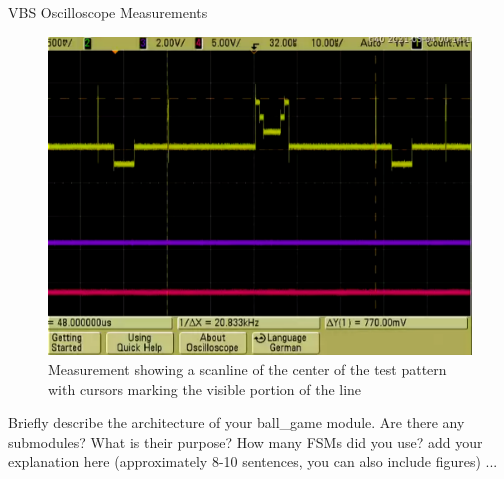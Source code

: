 \documentclass[10pt,a4paper,titlepage,oneside]{article}
\begin{document}
\begin{qa}{VBS Oscilloscope Measurements}
	\begin{figure}[h!]
		\centering
		\includegraphics[width=1.0\linewidth]{dia/oszi_3_scanline160_levels.png}
		\caption{Measurement showing a scanline of the center of the test pattern with cursors marking the visible portion of the line}
	\end{figure}

\end{qa}



\begin{qa}{Briefly describe the architecture of your \textsf{ball\_game} module. Are there any submodules? What is their purpose? How many FSMs did you use?}
add your explanation here (approximately 8-10 sentences, you can also include figures) ... 
\end{qa}

\end{document}
